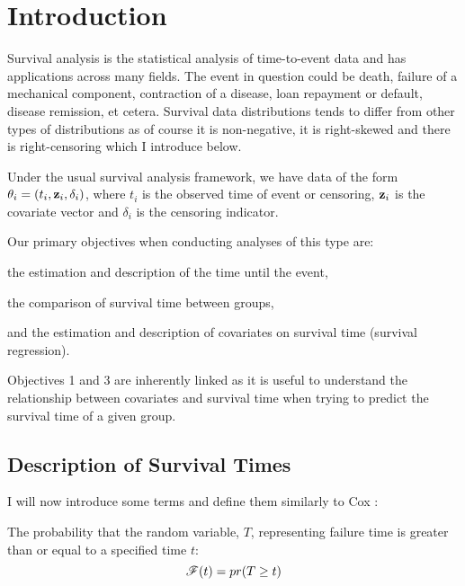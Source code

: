 \section{Introduction}

Survival analysis is the statistical analysis of time-to-event data and has applications across many fields. The event in question could be death, failure of a mechanical component, contraction of a disease, loan repayment or default, disease remission, et cetera. Survival data distributions tends to differ from other types of distributions as of course it is non-negative, it is right-skewed and there is right-censoring which I introduce below.

Under the usual survival analysis framework, we have data of the form $\theta_i=(t_i, \textbf{z}_i, \delta_i)$, where $t_i$ is the observed time of event or censoring, $\textbf{z}_i$ is the covariate vector and $\delta_i$ is the censoring indicator.

Our primary objectives when conducting analyses of this type are:
\begin{enumerate}
\begin{spacing}{0}
    \item the estimation and description of the time until the event,
    \item the comparison of survival time between groups,
    \item and the estimation and description of covariates on survival time (survival regression).
\end{spacing}
\end{enumerate}
Objectives 1 and 3 are inherently linked as it is useful to understand the relationship between covariates and survival time when trying to predict the survival time of a given group.

\subsection{Description of Survival Times}

I will now introduce some terms and define them similarly to Cox :

\begin{definition}\label{survivor-function}
The probability that the random variable, $T$, representing failure time is greater than or equal to a specified time $t$:
\begin{equation}
    \mathscr{F}(t)=pr(T\geq t)
\end{equation}
\end{definition}

